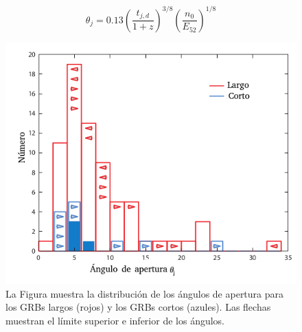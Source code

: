 \documentclass[12pt,a4paper]{book}
\begin{document}
%
%
%
\begin{equation}
\theta_j = 0.13 \left( \frac{t_{j,d}}{1+z} \right)^{3/8}
\left(\frac{n_0}{E_{52}} \right)^{1/8}
\end{equation}
%
%

\begin{figure}
\centering
\includegraphics[scale=0.7]{./Figuras/Distribucion_angulo_apertura}
\caption{La Figura muestra la distribución de los ángulos de apertura para los GRBs largos (rojos) y los GRBs cortos (azules). Las flechas muestran el límite superior e inferior de los ángulos. }
\end{figure}
\end{document}
